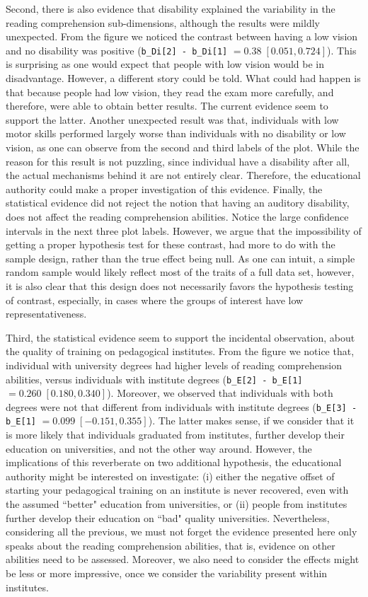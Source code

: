 Second, there is also evidence that disability explained the variability in the reading comprehension sub-dimensions, although the results were mildly unexpected. From the figure we noticed the contrast between having a low vision and no disability was positive (\texttt{b\_Di[2] - b\_Di[1]} $=0.38 \; [0.051, 0.724]$). This is surprising as one would expect that people with low vision would be in disadvantage. However, a different story could be told. What could had happen is that because people had low vision, they read the exam more carefully, and therefore, were able to obtain better results. The current evidence seem to support the latter. Another unexpected result was that, individuals with low motor skills performed largely worse than individuals with no disability or low vision, as one can observe from the second and third labels of the plot. While the reason for this result is not puzzling, since individual have a disability after all, the actual mechanisms behind it are not entirely clear. Therefore, the educational authority could make a proper investigation of this evidence. Finally, the statistical evidence did not reject the notion that having an auditory disability, does not affect the reading comprehension abilities. Notice the large confidence intervals in the next three plot labels. However, we argue that the impossibility of getting a proper hypothesis test for these contrast, had more to do with the sample design, rather than the true effect being null. As one can intuit, a simple random sample would likely reflect most of the traits of a full data set, however, it is also clear that this design does not necessarily favors the hypothesis testing of contrast, especially, in cases where the groups of interest have low representativeness.

Third, the statistical evidence seem to support the incidental observation, about the quality of training on pedagogical institutes. From the figure we notice that, individual with university degrees had higher levels of reading comprehension abilities, versus individuals with institute degrees (\texttt{b\_E[2] - b\_E[1]} $=0.260 \; [0.180, 0.340]$). Moreover, we observed that individuals with both degrees were not that different from individuals with institute degrees (\texttt{b\_E[3] - b\_E[1]} $=0.099 \; [-0.151, 0.355]$). The latter makes sense, if we consider that it is more likely that individuals graduated from institutes, further develop their education on universities, and not the other way around. However, the implications of this reverberate on two additional hypothesis, the educational authority might be interested on investigate: (i) either the negative offset of starting your pedagogical training on an institute is never recovered, even with the assumed ``better" education from universities, or (ii) people from institutes further develop their education on ``bad" quality universities. Nevertheless, considering all the previous, we must not forget the evidence presented here only speaks about the reading comprehension abilities, that is, evidence on other abilities need to be assessed. Moreover, we also need to consider the effects might be less or more impressive, once we consider the variability present within institutes.

